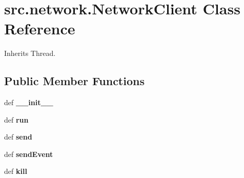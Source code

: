 \hypertarget{classsrc_1_1network_1_1_network_client}{\section{src.\-network.\-Network\-Client \-Class \-Reference}
\label{classsrc_1_1network_1_1_network_client}
}


\-Inherits \-Thread.

\subsection*{\-Public \-Member \-Functions}
\begin{DoxyCompactItemize}
\item 
\hypertarget{classsrc_1_1network_1_1_network_client_a58431ba3aadb56f426c6795cdbdcaca7}{def {\bfseries \-\_\-\-\_\-init\-\_\-\-\_\-}}\label{classsrc_1_1network_1_1_network_client_a58431ba3aadb56f426c6795cdbdcaca7}

\item 
\hypertarget{classsrc_1_1network_1_1_network_client_ad48886d4647613e7f5d620bf21be4373}{def {\bfseries run}}\label{classsrc_1_1network_1_1_network_client_ad48886d4647613e7f5d620bf21be4373}

\item 
\hypertarget{classsrc_1_1network_1_1_network_client_a02c88c1d8896faabe0a7b551c382bc9d}{def {\bfseries send}}\label{classsrc_1_1network_1_1_network_client_a02c88c1d8896faabe0a7b551c382bc9d}

\item 
\hypertarget{classsrc_1_1network_1_1_network_client_ad33e037a897cecb80e805a09bf70d4e8}{def {\bfseries send\-Event}}\label{classsrc_1_1network_1_1_network_client_ad33e037a897cecb80e805a09bf70d4e8}

\item 
\hypertarget{classsrc_1_1network_1_1_network_client_af1fe7118a9f57a81fb0d54a6bdb32548}{def {\bfseries kill}}\label{classsrc_1_1network_1_1_network_client_af1fe7118a9f57a81fb0d54a6bdb32548}

\end{DoxyCompactItemize}
